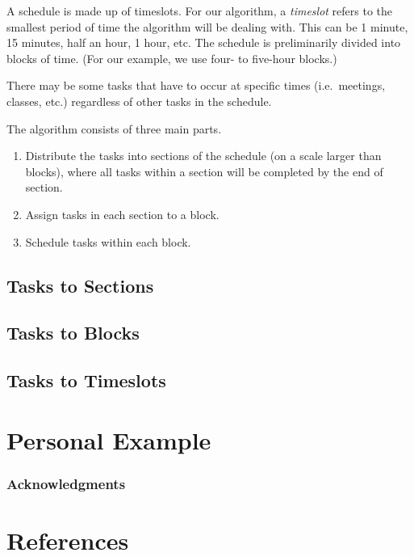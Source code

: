 \documentclass{article}
\newcommand{\todo}[1]{}
\begin{document}
	A schedule is made up of timeslots. For our algorithm, a \emph{timeslot} refers to the smallest period of time the algorithm will be dealing with. This can be 1 minute, 15 minutes, half an hour, 1 hour, etc.
	The schedule is preliminarily divided into blocks of time.
	(For our example, we use four- to five-hour blocks.)

	There may be some tasks that have to occur at specific times (i.e.~meetings, classes, etc.) regardless of other tasks in the schedule.

	The algorithm consists of three main parts.
	\begin{enumerate}
		\item Distribute the tasks into sections of the schedule (on a scale larger than blocks), where all tasks within a section will be completed by the end of section.
		\item Assign tasks in each section to a block. 
		\item Schedule tasks within each block.
	\end{enumerate}

\newpage
\subsection{Tasks to Sections}
\todo{}
\vspace{2.5in}

\subsection{Tasks to Blocks}
\todo{}
\vspace{2.5in}
\subsection{Tasks to Timeslots}
\todo{}

\newpage
\section{Personal Example}
\todo{}
\vspace{5in}



\subsubsection*{Acknowledgments}
\todo{}
\section*{References}
\todo{}

%
\end{document}
